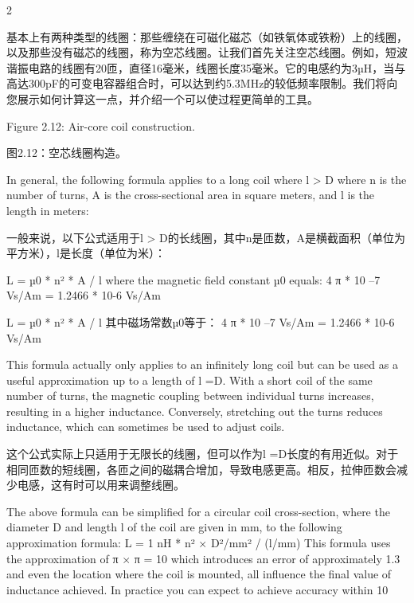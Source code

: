 \documentclass{ctexbook}
\begin{document}
\begin{paracol}{2}
\switchcolumn

基本上有两种类型的线圈：那些缠绕在可磁化磁芯（如铁氧体或铁粉）上的线圈，以及那些没有磁芯的线圈，称为空芯线圈。让我们首先关注空芯线圈。例如，短波谐振电路的线圈有20匝，直径16毫米，线圈长度35毫米。它的电感约为3µH，当与高达300pF的可变电容器组合时，可以达到约5.3MHz的较低频率限制。我们将向您展示如何计算这一点，并介绍一个可以使过程更简单的工具。

\switchcolumn*

Figure 2.12: Air-core coil construction. 

\switchcolumn

图2.12：空芯线圈构造。

\switchcolumn*

In general, the following formula applies to a long coil where l > D where n is the number 
of turns, A is the cross-sectional area in square meters, and l is the length in meters: 

\switchcolumn

一般来说，以下公式适用于l > D的长线圈，其中n是匝数，A是横截面积（单位为平方米），l是长度（单位为米）：

\switchcolumn*

L = µ0 * n² * A / l 
where the magnetic field constant µ0 equals: 
4 π * 10 –7 Vs/Am = 1.2466 * 10-6 Vs/Am 

\switchcolumn

L = µ0 * n² * A / l
其中磁场常数µ0等于：
4 π * 10 –7 Vs/Am = 1.2466 * 10-6 Vs/Am

\switchcolumn*

This formula actually only applies to an infinitely long coil but can be used as a useful 
approximation up to a length of l =D. With a short coil of the same number of turns, the 
magnetic coupling between individual turns increases, resulting in a higher inductance. 
Conversely, stretching out the turns reduces inductance, which can sometimes be used to 
adjust coils. 

\switchcolumn

这个公式实际上只适用于无限长的线圈，但可以作为l =D长度的有用近似。对于相同匝数的短线圈，各匝之间的磁耦合增加，导致电感更高。相反，拉伸匝数会减少电感，这有时可以用来调整线圈。

\switchcolumn*

The above formula can be simplified for a circular coil cross-section, where the diameter D 
and length l of the coil are given in mm, to the following approximation formula: 
L = 1 nH * n² × D²/mm² / (l/mm) 
This formula uses the approximation of π × π = 10 which introduces an error of approximately 1.3%
and even the location where the coil is mounted, all influence the final value of inductance 
achieved. In practice you can expect to achieve accuracy within 10%


\end{paracol}
\end{document}
